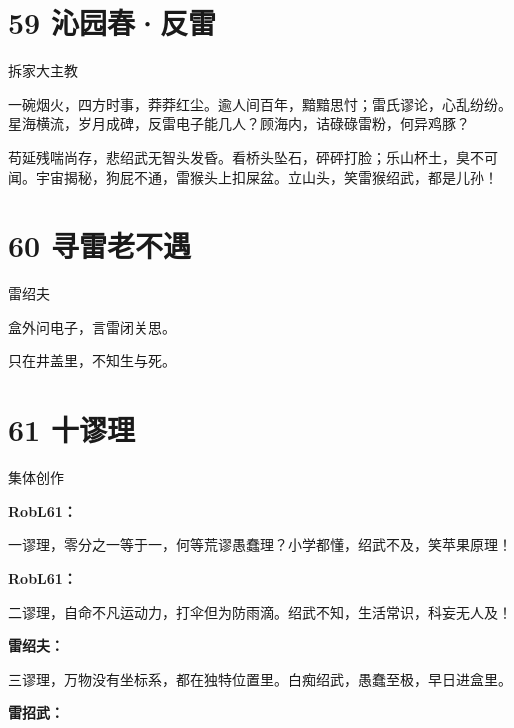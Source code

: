 \documentclass[UTF8,12pt,oneside]{ctexbook}
\begin{document}
        
        \section{59 沁园春·反雷}
        \begin{center}
            拆家大主教
        \end{center}
        
        一碗烟火，四方时事，莽莽红尘。逾人间百年，黯黯思忖；雷氏谬论，心乱纷纷。星海横流，岁月成碑，反雷电子能几人？顾海内，诘碌碌雷粉，何异鸡豚？
        
        苟延残喘尚存，悲绍武无智头发昏。看桥头坠石，砰砰打脸；乐山杯土，臭不可闻。宇宙揭秘，狗屁不通，雷猴头上扣屎盆。立山头，笑雷猴绍武，都是儿孙！
        
        \section{60 寻雷老不遇}
        \begin{center}
            雷绍夫
        \end{center}
        \begin{center}
            盒外问电子，言雷闭关思。
            
            只在井盖里，不知生与死。
        \end{center}
        
        \newpage
        
        \section{61 十谬理}
        \begin{center}
            集体创作
        \end{center}
        
        \noindent\textbf{RobL61：}
        
        一谬理，零分之一等于一，何等荒谬愚蠢理？小学都懂，绍武不及，笑苹果原理！
        
        \noindent\textbf{RobL61：}
        
        二谬理，自命不凡运动力，打伞但为防雨滴。绍武不知，生活常识，科妄无人及！
        
        \noindent\textbf{雷绍夫：}
        
        三谬理，万物没有坐标系，都在独特位置里。白痴绍武，愚蠢至极，早日进盒里。
        
        \noindent\textbf{雷招武：}
        
\end{document}
